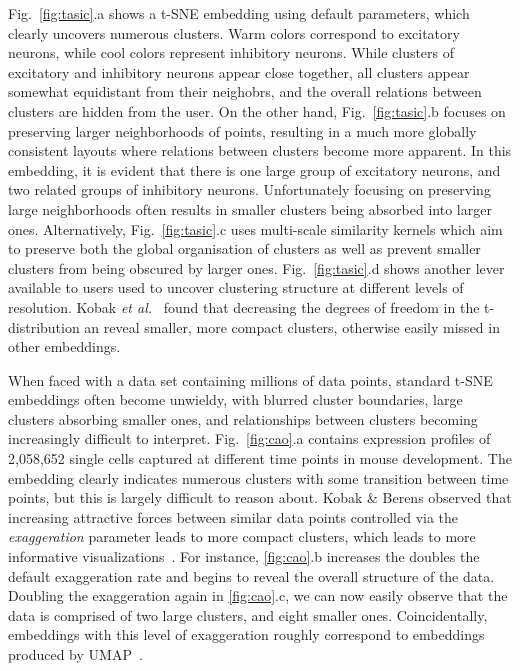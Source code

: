 \documentclass[twocolumn]{bmcart}
\begin{document}
Fig.~\ref{fig:tasic}.a shows a t-SNE embedding using default parameters, which clearly uncovers numerous clusters. Warm colors correspond to excitatory neurons, while cool colors represent inhibitory neurons. While clusters of excitatory and inhibitory neurons appear close together, all clusters appear somewhat equidistant from their neighobrs, and the overall relations between clusters are hidden from the user. On the other hand, Fig.~\ref{fig:tasic}.b focuses on preserving larger neighborhoods of points, resulting in a much more globally consistent layouts where relations between clusters become more apparent. In this embedding, it is evident that there is one large group of excitatory neurons, and two related groups of inhibitory neurons. Unfortunately focusing on preserving large neighborhoods often results in smaller clusters being absorbed into larger ones. Alternatively, Fig.~\ref{fig:tasic}.c uses multi-scale similarity kernels which aim to preserve both the global organisation of clusters as well as prevent smaller clusters from being obscured by larger ones. Fig.~\ref{fig:tasic}.d shows another lever available to users used to uncover clustering structure at different levels of resolution. Kobak \textit{et al.}~\cite{kobak2019heavy} found that decreasing the degrees of freedom in the t-distribution an reveal smaller, more compact clusters, otherwise easily missed in other embeddings.

When faced with a data set containing millions of data points, standard t-SNE embeddings often become unwieldy, with blurred cluster boundaries, large clusters absorbing smaller ones, and relationships between clusters becoming increasingly difficult to interpret. Fig.~\ref{fig:cao}.a contains expression profiles of 2,058,652 single cells captured at different time points in mouse development. The embedding clearly indicates numerous clusters with some transition between time points, but this is largely difficult to reason about. Kobak \& Berens observed that increasing attractive forces between similar data points controlled via the \textit{exaggeration} parameter leads to more compact clusters, which leads to more informative visualizations~\cite{kobak2019art}. For instance, \ref{fig:cao}.b increases the doubles the default exaggeration rate and begins to reveal the overall structure of the data. Doubling the exaggeration again in \ref{fig:cao}.c, we can now easily observe that the data is comprised of two large clusters, and eight smaller ones. Coincidentally, embeddings with this level of exaggeration roughly correspond to embeddings produced by UMAP~\cite{TODO}.
\end{document}
